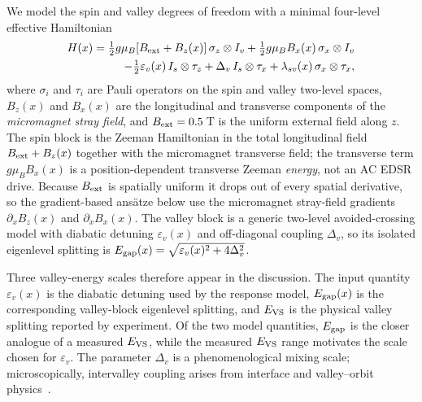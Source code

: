 \documentclass[aip,jap,reprint,superscriptaddress,longbibliography,floatfix]{revtex4-2}
\begin{document}
We model the spin and valley degrees of freedom with a minimal
four-level effective Hamiltonian
%
\begin{align}
H(x) = \tfrac{1}{2}g\mu_B [B_{\rm ext}+B_z(x)]\,\sigma_z\otimes I_v
      + \tfrac{1}{2}g\mu_B B_x(x)\,\sigma_x\otimes I_v \nonumber\\
      - \tfrac{1}{2}\varepsilon_v(x)\,I_s\otimes\tau_z
      + \Delta_v\,I_s\otimes\tau_x
      + \lambda_{sv}(x)\,\sigma_x\otimes\tau_x,
\end{align}
%
where $\sigma_i$ and $\tau_i$ are Pauli operators on the spin and
valley two-level spaces, $B_z(x)$ and $B_x(x)$ are the longitudinal and
transverse components of the \emph{micromagnet stray field}, and
$B_{\rm ext}=0.5$\,T is the uniform external field along $z$. The spin
block is the Zeeman Hamiltonian in the total longitudinal field
$B_{\rm ext}+B_z(x)$ together with the micromagnet transverse field; the
transverse term $g\mu_B B_x(x)$ is a
position-dependent transverse Zeeman \emph{energy}, not an AC EDSR
drive. Because $B_{\rm ext}$ is spatially uniform it drops out of every
spatial derivative, so the gradient-based ans\"atze below use the
micromagnet stray-field gradients $\partial_x B_z(x)$ and
$\partial_x B_x(x)$. The valley block is a generic two-level avoided-crossing model with
diabatic detuning $\varepsilon_v(x)$ and off-diagonal coupling $\Delta_v$, so
its isolated eigenlevel splitting is
$E_{\rm gap}(x)=\sqrt{\varepsilon_v(x)^2+4\Delta_v^2}$.

Three valley-energy scales therefore appear in the discussion. The input
quantity $\varepsilon_v(x)$ is the diabatic detuning used by the response
model, $E_{\rm gap}(x)$ is the corresponding valley-block eigenlevel splitting,
and $E_{\rm VS}$ is the physical valley splitting reported by experiment. Of
the two model quantities, $E_{\rm gap}$ is the closer analogue of a measured
$E_{\rm VS}$, while the measured $E_{\rm VS}$ range motivates the scale chosen
for $\varepsilon_v$. The parameter $\Delta_v$ is a phenomenological mixing
scale; microscopically, intervalley coupling arises from interface and
valley--orbit physics~\cite{friesen_theory_2010}.
\end{document}
